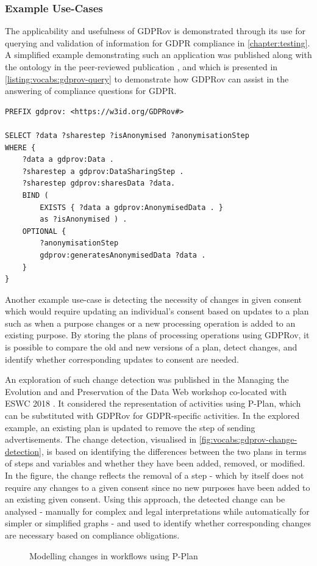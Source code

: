 \subsubsection{Example Use-Cases}
The applicability and usefulness of GDPRov is demonstrated through its use for querying and validation of information for GDPR compliance in \autoref{chapter:testing}.
A simplified example demonstrating such an application was published along with the ontology in the peer-reviewed publication \cite{}, and which is presented in \autoref{listing:vocabs:gdprov-query} to demonstrate how GDPRov can assist in the answering of compliance questions for GDPR.

\begin{lstlisting}[label={listing:vocabs:gdprov-query},caption={SPARQL query demonstrating use of GDPRov in representing and retrieving steps, data, anonymity level, and anonymisation process based on sharing of data \cite{}}]
PREFIX gdprov: <https://w3id.org/GDPRov#>

SELECT ?data ?sharestep ?isAnonymised ?anonymisationStep
WHERE {
    ?data a gdprov:Data .
    ?sharestep a gdprov:DataSharingStep .
    ?sharestep gdprov:sharesData ?data. 
    BIND (
        EXISTS { ?data a gdprov:AnonymisedData . }
        as ?isAnonymised ) .
    OPTIONAL {
        ?anonymisationStep
        gdprov:generatesAnonymisedData ?data .
    }
}
\end{lstlisting}

Another example use-case is detecting the necessity of changes in given consent which would require updating an individual's consent based on updates to a plan such as when a purpose changes or a new processing operation is added to an existing purpose. By storing the plans of processing operations using GDPRov, it is possible to compare the old and new versions of a plan, detect changes, and identify whether corresponding updates to consent are needed. 

An exploration of such change detection was published in the Managing the Evolution and and Preservation of the Data Web workshop co-located with ESWC 2018 \cite{}.
It considered the representation of activities using P-Plan, which can be substituted with GDPRov for GDPR-specific activities. In the explored example, an existing plan is updated to remove the step of sending advertisements. The change detection, visualised in \autoref{fig:vocabs:gdprov-change-detection}, is based on identifying the differences between the two plans in terms of steps and variables and whether they have been added, removed, or modified.
In the figure, the change reflects the removal of a step - which by itself does not require any changes to a given consent since no new purposes have been added to an existing given consent.
Using this approach, the detected change can be analysed - manually for complex and legal interpretations while automatically for simpler or simplified graphs - and used to identify whether corresponding changes are necessary based on compliance obligations.
\begin{figure}[htbp]
    \centering
    \missingfigure[figcolor=white]{}
    \caption{Modelling changes in workflows using P-Plan \cite{}}
    \label{fig:vocabs:gdprov-change-detection}
\end{figure}


